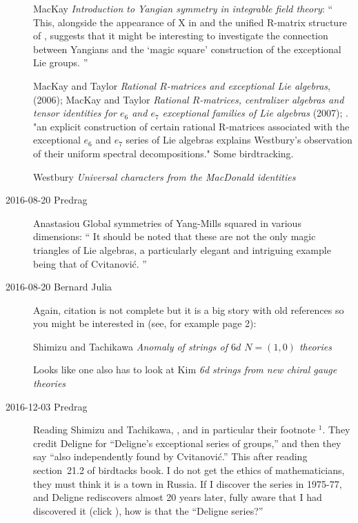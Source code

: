 \begin{description}
MacKay
{\em Introduction to {Yangian} symmetry in integrable field theory}:
``
This, alongside the appearance of X in  and the
unified R-matrix structure of , suggests that it might be
interesting to investigate the connection between Yangians and the `magic
square' construction of the exceptional Lie groups.
''

MacKay and Taylor
{\em Rational {$R$}-matrices and exceptional {Lie} algebras},
(2006); 
MacKay and Taylor
{\em Rational {$R$}-matrices, centralizer algebras and tensor identities 
for {$e_6$} and {$e_7$} exceptional families of {Lie} algebras} (2007);
.
"an explicit construction of certain rational R-matrices associated with 
the exceptional $e_6$ and $e_7$ series of Lie algebras  explains 
Westbury's observation of their uniform spectral 
decompositions." Some birdtracking.
  
Westbury
{\em Universal characters from the {MacDonald} identities}


\item[2016-08-20 Predrag]
Anastasiou \etal{}
{Global symmetries of {Yang-Mills} squared in various dimensions}: ``
It should be noted that these are not the only magic triangles of Lie
algebras, a particularly elegant and intriguing example being that of
Cvitanovi{\'c}.
''

\item[2016-08-20 Bernard Julia]
Again, citation is not complete but it is a big story with old references
so you might be interested in (see, for example page 2):

Shimizu and Tachikawa
{\em Anomaly of strings of {$6d$ $N = (1,0)$} theories}

Looks like one also has to look at
Kim \etal{} {\em {6d} strings from new chiral gauge theories}

\item[2016-12-03 Predrag]
Reading Shimizu and Tachikawa, ,
and in particular their footnote $^1$.
They credit Deligne for ``Deligne's exceptional series of groups,'' and then
they say ``also independently found by Cvitanovi{\'c}.'' This after reading
section~21.2 of birdtacks book. I do not get the ethics of
mathematicians, they must think it is a town in Russia. If I discover the
series in 1975-77, and Deligne rediscovers almost 20 years
later, fully aware that I had discovered it (click
), how is that the
``Deligne series?''


\end{description}
